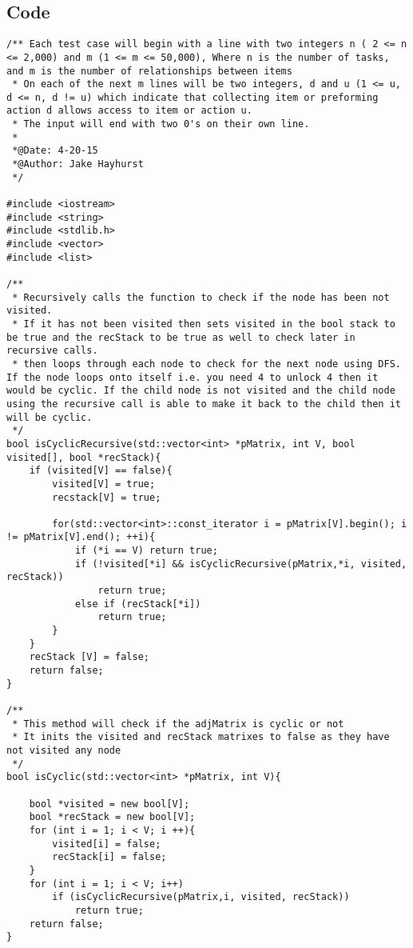 \documentclass[11pt]{article}
\begin{document}
\subsection{Code}
\begin{lstlisting}[frame=single]
/** Each test case will begin with a line with two integers n ( 2 <= n <= 2,000) and m (1 <= m <= 50,000), Where n is the number of tasks, and m is the number of relationships between items 
 * On each of the next m lines will be two integers, d and u (1 <= u, d <= n, d != u) which indicate that collecting item or preforming action d allows access to item or action u.
 * The input will end with two 0's on their own line. 
 *
 *@Date: 4-20-15
 *@Author: Jake Hayhurst
 */

#include <iostream>
#include <string>
#include <stdlib.h>
#include <vector>
#include <list>

/**
 * Recursively calls the function to check if the node has been not visited.
 * If it has not been visited then sets visited in the bool stack to be true and the recStack to be true as well to check later in recursive calls.
 * then loops through each node to check for the next node using DFS. If the node loops onto itself i.e. you need 4 to unlock 4 then it would be cyclic. If the child node is not visited and the child node using the recursive call is able to make it back to the child then it will be cyclic.
 */
bool isCyclicRecursive(std::vector<int> *pMatrix, int V, bool visited[], bool *recStack){
    if (visited[V] == false){
        visited[V] = true;
        recstack[V] = true;
                
        for(std::vector<int>::const_iterator i = pMatrix[V].begin(); i != pMatrix[V].end(); ++i){
            if (*i == V) return true;
            if (!visited[*i] && isCyclicRecursive(pMatrix,*i, visited, recStack))
                return true;
            else if (recStack[*i])
                return true; 
        }
    }
    recStack [V] = false;
    return false;
}

/**
 * This method will check if the adjMatrix is cyclic or not
 * It inits the visited and recStack matrixes to false as they have not visited any node
 */
bool isCyclic(std::vector<int> *pMatrix, int V){  
    
    bool *visited = new bool[V];
    bool *recStack = new bool[V];
    for (int i = 1; i < V; i ++){
        visited[i] = false;
        recStack[i] = false;
    }   
    for (int i = 1; i < V; i++)
        if (isCyclicRecursive(pMatrix,i, visited, recStack))
            return true;
    return false;   
}



\end{lstlisting}
\end{document}
